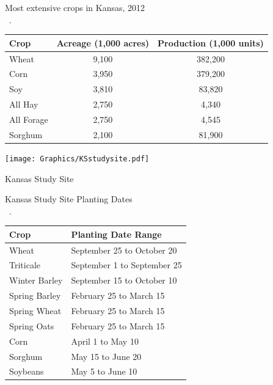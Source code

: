 \begin{sstable}
  \centering
  \caption[Most extensive crops in Kansas, 2012.]{Most extensive crops in Kansas, 2012\\~\autocite[adapted from][]{usda2013kansascrops}.}
  \label{table:kansas}
  \begin{tabu}{lcc}
    \toprule
    \textbf{Crop} & \textbf{Acreage (1,000 acres)} & \textbf{Production (1,000 units)} \\
    \midrule
    Wheat & 9,100 & 382,200 \\
    Corn & 3,950 & 379,200 \\
    Soy & 3,810 & 83,820 \\
    All Hay & 2,750 & 4,340 \\
    All Forage & 2,750 & 4,545 \\
    Sorghum & 2,100 & 81,900 \\      
    \bottomrule
  \end{tabu}
\end{sstable}

\begin{ssfigure}
  \centering
  \texttt{[image: Graphics/KSstudysite.pdf]}
  \caption{Kansas Study Site}
  \label{fig:KSstudysite}
\end{ssfigure}

\begin{sstable}
  \centering
  \caption[Kansas Study Site Planting Dates]{Kansas Study Site Planting Dates\\~\autocite[adapted from][]{shroyer1996kansas}.}
  \label{table:KSplantingdates}
  \begin{tabu} to 4.5in {X[1,m,c]X[2,m,c]}
    \toprule
    \textbf{Crop} & \textbf{Planting Date Range} \\
    \midrule
    Wheat & September 25 to October 20 \\
    Triticale & September 1 to September 25 \\
    Winter Barley & September 15 to October 10 \\
    Spring Barley & February 25 to March 15 \\
    Spring Wheat & February 25 to March 15 \\
    Spring Oats & February 25 to March 15 \\
    Corn & April 1 to May 10 \\
    Sorghum & May 15 to June 20 \\
    Soybeans & May 5 to June 10 \\
    \bottomrule
  \end{tabu}
\end{sstable}


